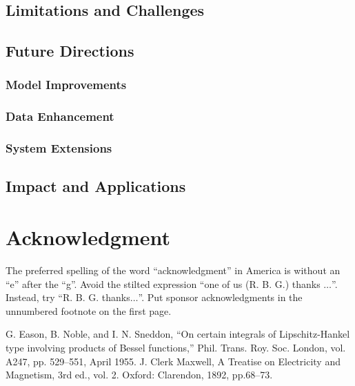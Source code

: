 \documentclass[conference]{IEEEtran}
\begin{document}
\subsection{Limitations and Challenges}

\subsection{Future Directions}

\subsubsection{Model Improvements}

\subsubsection{Data Enhancement}

\subsubsection{System Extensions}

\subsection{Impact and Applications}

\section*{Acknowledgment}

The preferred spelling of the word ``acknowledgment'' in America is without 
an ``e'' after the ``g''. Avoid the stilted expression ``one of us (R. B. 
G.) thanks $\ldots$''. Instead, try ``R. B. G. thanks$\ldots$''. Put sponsor 
acknowledgments in the unnumbered footnote on the first page.

\begin{thebibliography}{00}
 G. Eason, B. Noble, and I. N. Sneddon, ``On certain integrals of Lipschitz-Hankel type involving products of Bessel functions,'' Phil. Trans. Roy. Soc. London, vol. A247, pp. 529--551, April 1955.
 J. Clerk Maxwell, A Treatise on Electricity and Magnetism, 3rd ed., vol. 2. Oxford: Clarendon, 1892, pp.68--73.
\end{thebibliography}
\end{document}
